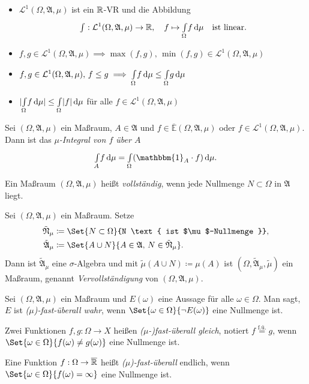\documentclass{cheat-sheet}
\newcommand{\ER}{\overline\R} %
\newcommand{\Alg}{\mathfrak{A}} %
\newcommand{\E}{\mathbb{E}} %
\newcommand{\Leb}{\mathcal{L}} %
\newcommand{\ind}{\mathbbm{1}} %
\newcommand{\IntOmu}[1]{\Int{\Omega}{}{#1}{\mu}} %
\begin{document}
\begin{satz}
  \begin{itemize}
    \item $\Leb^1(\Omega, \Alg, \mu)$ ist ein $\mathbb{R}$-VR und die Abbildung
    \[ {\textstyle \int} : \Leb^1(\Omega, \Alg, \mu) \to \R, \quad f \mapsto \IntOmu{f} \quad \text{ist linear.} \]
    \item $f, g \in \Leb^1(\Omega, \Alg, \mu) \implies \max(f, g), \, \min(f, g) \in \Leb^1(\Omega, \Alg, \mu)$
    \item $f, g \in \Leb^1(\Omega, \Alg, \mu), \, f \leq g \implies \IntOmu{f} \leq \IntOmu{g}$ 
    \item $\abs{\IntOmu{f}} \leq \IntOmu{\abs{f}}$ für alle $f \in \Leb^1(\Omega, \Alg, \mu)$ 
  \end{itemize}
\end{satz}

\begin{defn}
  Sei $(\Omega, \Alg, \mu)$ ein Maßraum, $A \in \Alg$ und $f \in \overline{\E}(\Omega, \Alg, \mu)$ oder $f \in \Leb^1(\Omega, \Alg, \mu)$. Dann ist das \emph{$\mu$-Integral von $f$ über $A$}
  \[ \Int{A}{}{f}{\mu} = \IntOmu{(\ind_A \cdot f)}. \]
\end{defn}

\begin{defn}
  Ein Maßraum $(\Omega, \Alg, \mu)$ heißt \emph{vollständig}, wenn jede Nullmenge $N \subset \Omega$ in $\Alg$ liegt.
\end{defn}

\begin{defn}
  Sei $(\Omega, \Alg, \mu)$ ein Maßraum. Setze
  \begin{align*}
    \tilde{\mathfrak{N}}_\mu &\coloneqq \Set{N \subset \Omega}{N \text{ ist $\mu$-Nullmenge }}, \\
    \tilde{\Alg}_\mu &\coloneqq \Set{ A \cup N }{ A \in \Alg, \, N \in \tilde{\mathfrak{N}}_\mu }.
  \end{align*}
  Dann ist $\tilde{\Alg}_\mu$ eine $\sigma$-Algebra und mit $\tilde{\mu}(A \cup N) \coloneqq \mu(A)$ ist $(\Omega, \tilde{\Alg}_\mu, \tilde{\mu})$ ein Maßraum, genannt \emph{Vervollständigung} von $(\Omega, \Alg, \mu)$.
\end{defn}

\begin{defn}
  Sei $(\Omega, \Alg, \mu)$ ein Maßraum und $E(\omega)$ eine Aussage für alle $\omega \in \Omega$. Man sagt, $E$ ist \emph{($\mu$)-fast-überall wahr}, wenn $\Set{\omega \in \Omega}{\neg E(\omega)}$ eine Nullmenge ist.

  Zwei Funktionen $f, g : \Omega \to X$ heißen \emph{($\mu$-)fast-überall gleich}, notiert $f \overset{\text{f.ü.}}= g$, wenn $\Set{\omega \in \Omega}{f(\omega) \not= g(\omega)}$ eine Nullmenge ist.

  Eine Funktion $f : \Omega \to \ER$ heißt \emph{($\mu$)-fast-überall} endlich, wenn $\Set{\omega \in \Omega}{ f(\omega) = \infty}$ eine Nullmenge ist.
\end{defn}
\end{document}

